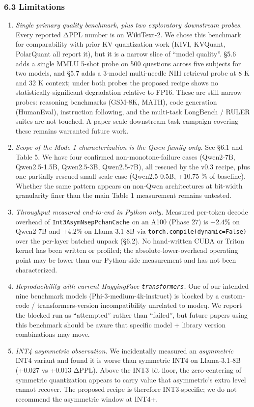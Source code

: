 \subsubsection{6.3 Limitations}\label{limitations}

\begin{enumerate}
\def\labelenumi{\arabic{enumi}.}
\item
  \emph{Single primary quality benchmark, plus two exploratory
  downstream probes.} Every reported ΔPPL number is on WikiText-2. We
  chose this benchmark for comparability with prior KV quantization work
  (KIVI, KVQuant, PolarQuant all report it), but it is a narrow slice of
  ``model quality''. §5.6 adds a single MMLU 5-shot probe on 500
  questions across five subjects for two models, and §5.7 adds a 3-model
  multi-needle NIH retrieval probe at 8 K and 32 K context; under both
  probes the proposed recipe shows no statistically-significant
  degradation relative to FP16. These are still narrow probes: reasoning
  benchmarks (GSM-8K, MATH), code generation (HumanEval), instruction
  following, and the multi-task LongBench / RULER suites are not
  touched. A paper-scale downstream-task campaign covering these remains
  warranted future work.
\item
  \emph{Scope of the Mode 1 characterization is the Qwen family only.}
  See §6.1 and Table 5. We have four confirmed non-monotone-failure
  cases (Qwen2-7B, Qwen2.5-1.5B, Qwen2.5-3B, Qwen2.5-7B), all rescued by
  the v0.3 recipe, plus one partially-rescued small-scale case
  (Qwen2.5-0.5B, +10.75 \% of baseline). Whether the same pattern
  appears on non-Qwen architectures at bit-width granularity finer than
  the main Table 1 measurement remains untested.
\item
  \emph{Throughput measured end-to-end in Python only.} Measured
  per-token decode overhead of \texttt{Int3AsymNsepPchanCache} on an
  A100 (Phase 27) is \(+2.4 \%\) on Qwen2-7B and \(+4.2 \%\) on
  Llama-3.1-8B via \texttt{torch.compile(dynamic=False)} over the
  per-layer batched unpack (§6.2). No hand-written CUDA or Triton kernel
  has been written or profiled; the absolute-lower-overhead operating
  point may be lower than our Python-side measurement and has not been
  characterized.
\item
  \emph{Reproducibility with current HuggingFace \texttt{transformers}.}
  One of our intended nine benchmark models (Phi-3-medium-4k-instruct)
  is blocked by a custom-code / transformers-version incompatibility
  unrelated to modeq. We report the blocked run as ``attempted'' rather
  than ``failed'', but future papers using this benchmark should be
  aware that specific model + library version combinations may move.
\item
  \emph{INT4 asymmetric observation.} We incidentally measured an
  \emph{asymmetric} INT4 variant and found it is worse than symmetric
  INT4 on Llama-3.1-8B (+0.027 vs +0.013 ΔPPL). Above the INT3 bit
  floor, the zero-centering of symmetric quantization appears to carry
  value that asymmetric's extra level cannot recover. The proposed
  recipe is therefore INT3-specific; we do not recommend the asymmetric
  window at INT4+.
\end{enumerate}

